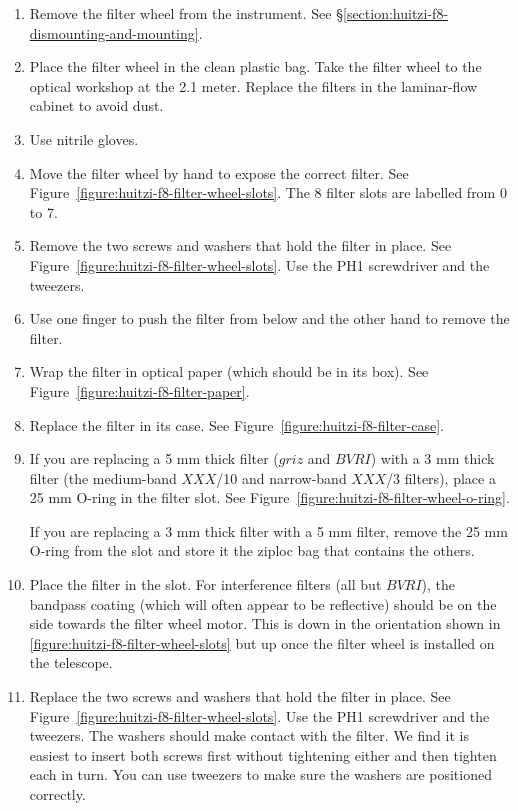 \begin{enumerate}
    \item Remove the filter wheel from the instrument. See \S\ref{section:huitzi-f8-dismounting-and-mounting}.
    \item Place the filter wheel in the clean plastic bag. Take the filter wheel to the optical workshop at the 2.1 meter. Replace the filters in the laminar-flow cabinet to avoid dust.
    \item Use nitrile gloves.
    \item Move the filter wheel by hand to expose the correct filter. See Figure~\ref{figure:huitzi-f8-filter-wheel-slots}. The 8 filter slots are labelled from 0 to 7.
    \item Remove the two screws and washers that hold the filter in place. See Figure~\ref{figure:huitzi-f8-filter-wheel-slots}.  Use the PH1 screwdriver and the tweezers.
    \item Use one finger to push the filter from below and the other hand to remove the filter.
    \item Wrap the filter in optical paper (which should be in its box). See Figure~\ref{figure:huitzi-f8-filter-paper}.
    \item Replace the filter in its case. See Figure~\ref{figure:huitzi-f8-filter-case}.
    \item If you are replacing a 5 mm thick filter ($griz$ and $BVRI$) with a 3 mm thick filter (the medium-band $XXX$/10 and narrow-band $XXX$/3 filters), place a 25 mm O-ring in the filter slot. See Figure~\ref{figure:huitzi-f8-filter-wheel-o-ring}.
    
    If you are replacing a 3 mm thick filter with a 5 mm filter, remove the 25 mm O-ring from the slot and store it the ziploc bag that contains the others.
    
    \item Place the filter in the slot. For interference filters (all but $BVRI$), the bandpass coating (which will often appear to be reflective) should be on the side towards the filter wheel motor. This is down in the orientation shown in \ref{figure:huitzi-f8-filter-wheel-slots} but up once the filter wheel is installed on the telescope.
    
    \item Replace the  two screws and washers that hold the filter in place. See Figure~\ref{figure:huitzi-f8-filter-wheel-slots}.  Use the PH1 screwdriver and the tweezers. The washers should make contact with the filter. We find it is easiest to insert both screws first without tightening either and then tighten each in turn. You can use tweezers to make sure the washers are positioned correctly.
    

\end{enumerate}
